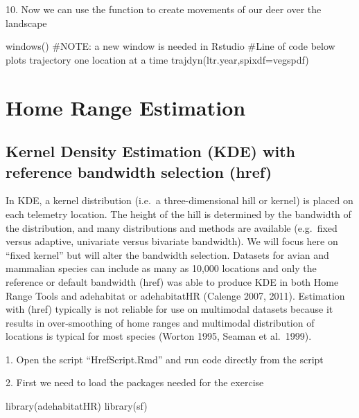 \documentclass[
  letterpaper,
]{book}
\newenvironment{Shaded}{\begin{snugshade}}{\end{snugshade}}
\newcommand{\AttributeTok}[1]{\textcolor[rgb]{0.40,0.45,0.13}{#1}}
\newcommand{\CommentTok}[1]{\textcolor[rgb]{0.37,0.37,0.37}{#1}}
\newcommand{\FunctionTok}[1]{\textcolor[rgb]{0.28,0.35,0.67}{#1}}
\newcommand{\NormalTok}[1]{\textcolor[rgb]{0.00,0.23,0.31}{#1}}
\begin{document}
10. Now we can use the function to create movements of our deer over the
landscape

\begin{Shaded}
\begin{Highlighting}[]
\FunctionTok{windows}\NormalTok{() }\CommentTok{\#NOTE: a new window is needed in Rstudio}
\CommentTok{\#Line of code below plots trajectory one location at a time}
\FunctionTok{trajdyn}\NormalTok{(ltr.year,}\AttributeTok{spixdf=}\NormalTok{vegspdf)}
\end{Highlighting}
\end{Shaded}

\part{Home Range Estimation}

\hypertarget{kernel-density-estimation-kde-with-reference-bandwidth-selection-href}{%
\chapter{Kernel Density Estimation (KDE) with reference bandwidth
selection
(href)}\label{kernel-density-estimation-kde-with-reference-bandwidth-selection-href}}

In KDE, a kernel distribution (i.e.~a three-dimensional hill or kernel)
is placed on each telemetry location. The height of the hill is
determined by the bandwidth of the distribution, and many distributions
and methods are available (e.g.~fixed versus adaptive, univariate versus
bivariate bandwidth). We will focus here on ``fixed kernel'' but will
alter the bandwidth selection. Datasets for avian and mammalian species
can include as many as 10,000 locations and only the reference or
default bandwidth (href) was able to produce KDE in both Home Range
Tools and adehabitat or adehabitatHR (Calenge 2007, 2011). Estimation
with (href) typically is not reliable for use on multimodal datasets
because it results in over-smoothing of home ranges and multimodal
distribution of locations is typical for most species (Worton 1995,
Seaman et al.~1999).

1. Open the script ``HrefScript.Rmd'' and run code directly from the
script

2. First we need to load the packages needed for the exercise

\begin{Shaded}
\begin{Highlighting}[]
\FunctionTok{library}\NormalTok{(adehabitatHR)}
\FunctionTok{library}\NormalTok{(sf)}
\end{Highlighting}
\end{Shaded}
\end{document}
